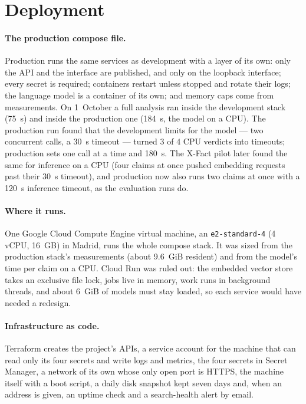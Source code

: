 
\section{Deployment}
\label{sec:dev-deployment}

\paragraph{The production compose file.} Production runs the same
services as development with a layer of its own: only the API and the
interface are published, and only on the loopback interface; every
secret is required; containers restart unless stopped and rotate their
logs; the language model is a container of its own; and memory caps
come from measurements. On 1~October a full analysis ran inside the
development stack (75~s) and inside the production one (184~s, the model
on a CPU). The production run found that the development limits for the
model --- two concurrent calls, a 30~s timeout --- turned 3 of 4 CPU
verdicts into timeouts; production sets one call at a time and 180~s.
The X-Fact pilot later found the same for inference on a CPU (four
claims at once pushed embedding requests past their 30~s timeout), and
production now also runs two claims at once with a 120~s inference
timeout, as the evaluation runs do.

\paragraph{Where it runs.} One Google Cloud Compute Engine virtual
machine, an \texttt{e2-standard-4} (4 vCPU, 16~GB) in Madrid, runs the
whole compose stack. It was sized from the production stack's
measurements (about 9.6~GiB resident) and from the model's time per
claim on a CPU. Cloud Run was ruled out: the embedded vector store takes
an exclusive file lock, jobs live in memory, work runs in background
threads, and about 6~GiB of models must stay loaded, so each service
would have needed a redesign.

\paragraph{Infrastructure as code.} Terraform creates the project's
APIs, a service account for the machine that can read only its four
secrets and write logs and metrics, the four secrets in Secret Manager,
a network of its own whose only open port is HTTPS, the machine itself
with a boot script, a daily disk snapshot kept seven days and, when an
address is given, an uptime check and a search-health alert by email.

